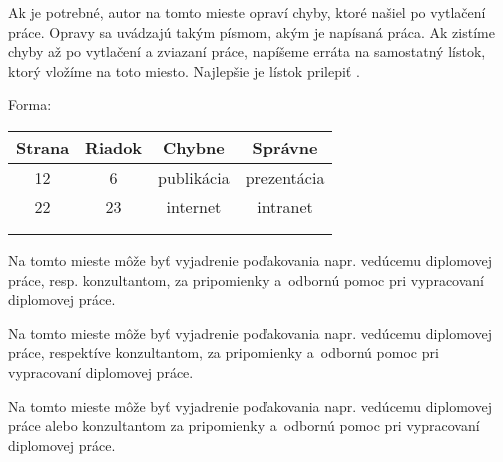 \documentclass[a4paper]{tukediphc}
\begin{document}
\renewcommand\theHfigure{\theHsection.\arabic{figure}}
\renewcommand\theHtable{\theHsection.\arabic{table}}


\prvastrana

\titulnastrana

\errata %
Ak je potrebné, autor na tomto mieste opraví chyby, ktoré našiel po
vytlačení práce. Opravy sa uvádzajú takým písmom, akým je napísaná
práca. Ak zistíme chyby až po vytlačení a zviazaní práce, napíšeme
erráta na samostatný lístok, ktorý vložíme na toto miesto. Najlepšie je
lístok prilepiť\/ \citep{kat}.

Forma:

\tabcolsep=10pt
\begin{table}[!hb]
	\centering
	\begin{tabular}{|c|c|c|c|}\hline
Strana & Riadok & Chybne & Správne \\\hline\hline
12 & 6 & publikácia & prezentácia \\\hline
22 & 23 & internet & intranet \\\hline
& & & \\\hline
& & & \\\hline
	\end{tabular}
\end{table}
\kerrata %

\abstraktsk %

\abstrakteng %

\kabstrakt %

\zadanieprace

\cestnevyhlasenie

\podakovanie
Na tomto mieste môže byť\/ vyjadrenie poďakovania napr. vedúcemu
diplomovej práce, resp. konzultantom, za pripomienky a~odbornú pomoc
pri vypracovaní diplomovej práce.

Na tomto mieste môže byť\/ vyjadrenie poďakovania napr. vedúcemu
diplomovej práce, respektíve konzultantom, za pripomienky a~odbornú
pomoc pri vypracovaní diplomovej práce.

Na tomto mieste môže byť\/ vyjadrenie poďakovania napr. vedúcemu
diplomovej práce alebo konzultantom za pripomienky a~odbornú pomoc pri
vypracovaní diplomovej práce.
\kpodakovania
\end{document}
